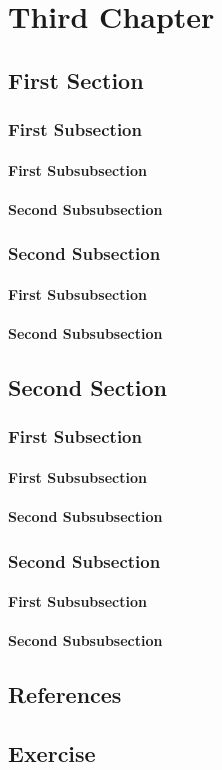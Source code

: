 \documentclass{book}
\begin{document}
\chapter{Third Chapter}
\lipsum
\section{First Section}
\lipsum
\subsection{First Subsection}
\subsubsection{First Subsubsection}
\lipsum
\subsubsection{Second Subsubsection}
\lipsum
\subsection{Second Subsection}
\subsubsection{First Subsubsection}
\lipsum
\subsubsection{Second Subsubsection}
\lipsum

\section{Second Section}
\lipsum
\subsection{First Subsection}
\subsubsection{First Subsubsection}
\lipsum
\subsubsection{Second Subsubsection}
\lipsum
\subsection{Second Subsection}
\subsubsection{First Subsubsection}
\lipsum
\subsubsection{Second Subsubsection}
\lipsum

\section*{References}
\lipsum
\section*{Exercise}
\lipsum
\end{document}
